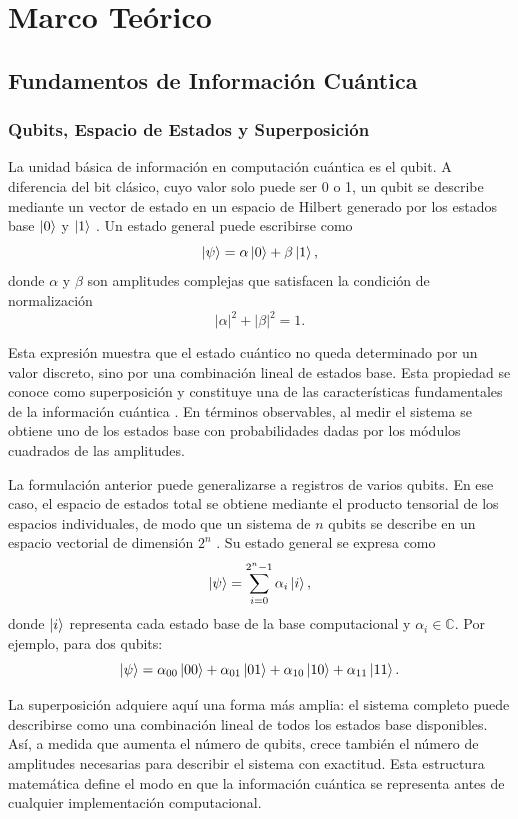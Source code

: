 \section{Marco Teórico}

\subsection{Fundamentos de Información Cuántica}

\subsubsection{Qubits, Espacio de Estados y Superposición}

La unidad básica de información en computación cuántica es el qubit. A diferencia del bit clásico, cuyo valor solo puede ser 0 o 1, un qubit se describe mediante un vector de estado en un espacio de Hilbert generado por los estados base $\ket{0}$ y $\ket{1}$ \parencite{Nielsen2010}. Un estado general puede escribirse como
\[
    \ket{\psi} = \alpha \ket{0} + \beta \ket{1},
\]
donde $\alpha$ y $\beta$ son amplitudes complejas que satisfacen la condición de normalización
\[
    |\alpha|^2 + |\beta|^2 = 1.
\]

Esta expresión muestra que el estado cuántico no queda determinado por un valor discreto, sino por una combinación lineal de estados base. Esta propiedad se conoce como superposición y constituye una de las características fundamentales de la información cuántica \parencite{Nielsen2010}. En términos observables, al medir el sistema se obtiene uno de los estados base con probabilidades dadas por los módulos cuadrados de las amplitudes.

La formulación anterior puede generalizarse a registros de varios qubits. En ese caso, el espacio de estados total se obtiene mediante el producto tensorial de los espacios individuales, de modo que un sistema de $n$ qubits se describe en un espacio vectorial de dimensión $2^n$ \parencite{Nielsen2010}. Su estado general se expresa como
\[
    \ket{\psi} = \sum_{i=0}^{2^n-1} \alpha_i \ket{i},
\]
donde $\ket{i}$ representa cada estado base de la base computacional y $\alpha_i \in \mathbb{C}$. Por ejemplo, para dos qubits:
\[
    \ket{\psi} = \alpha_{00}\ket{00} + \alpha_{01}\ket{01} + \alpha_{10}\ket{10} + \alpha_{11}\ket{11}.
\]

La superposición adquiere aquí una forma más amplia: el sistema completo puede describirse como una combinación lineal de todos los estados base disponibles. Así, a medida que aumenta el número de qubits, crece también el número de amplitudes necesarias para describir el sistema con exactitud. Esta estructura matemática define el modo en que la información cuántica se representa antes de cualquier implementación computacional.

